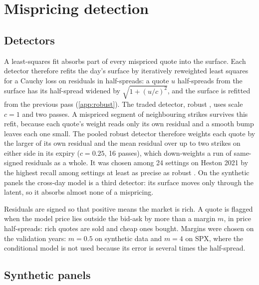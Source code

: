 \section{Mispricing detection}
\label{sec:mispricing}

\subsection{Detectors}

A least-squares fit absorbs part of every mispriced quote into the surface. Each detector therefore
refits the day's \mixfour{} surface by iteratively reweighted least squares~\citep{holland1977} for a
Cauchy loss on residuals in half-spreads: a quote $u$ half-spreads from the surface has its
half-spread widened by $\sqrt{1+(u/c)^2}$, and the surface is refitted from the previous pass
(\cref{app:robust}). The traded detector, robust \mixfour, uses scale $c=1$ and two passes. A
mispriced segment of neighbouring strikes survives this refit, because each quote's weight reads
only its own residual and a smooth bump leaves each one small. The pooled robust detector therefore
weights each quote by the larger of its own residual and the mean residual over up to two strikes on
either side in its expiry ($c=0.25$, 16 passes), which down-weights a run of same-signed residuals as
a whole. It was chosen among 24 settings on Heston 2021 by the highest recall among settings at least
as precise as robust \mixfour. On the synthetic panels the cross-day model is a third detector: its
surface moves only through the latent, so it absorbs almost none of a mispricing.

Residuals are signed so that positive means the market is rich. A quote is flagged when the model
price lies outside the bid-ask by more than a margin $m$, in price half-spreads: rich quotes are sold
and cheap ones bought. Margins were chosen on the validation years: $m=0.5$ on synthetic data and
$m=4$ on SPX, where the conditional model is not used because its error is several times the
half-spread.

\subsection{Synthetic panels}

